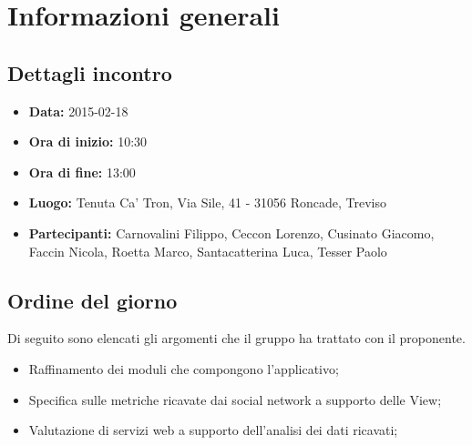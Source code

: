 %


\section{Informazioni generali} %
\label{sec:informazioni_generali}
	\subsection{Dettagli incontro} %
	\label{sub:dettagli_incontro}
		\begin{itemize}
			\item \textbf{Data:} 2015-02-18
			\item \textbf{Ora di inizio:} 10:30
			\item \textbf{Ora di fine:} 13:00
			\item \textbf{Luogo:} Tenuta Ca' Tron, Via Sile, 41 - 31056 Roncade, Treviso
			\item \textbf{Partecipanti:} Carnovalini Filippo, Ceccon Lorenzo, Cusinato Giacomo, Faccin Nicola, Roetta Marco, Santacatterina Luca, Tesser Paolo
		\end{itemize}

	\subsection{Ordine del giorno} %
	\label{sub:ordine_del_giorno}
	Di seguito sono elencati gli argomenti che il gruppo ha trattato con il proponente.
		\begin{itemize}
			\item Raffinamento dei moduli che compongono l'applicativo;
			\item Specifica sulle metriche ricavate dai social network a supporto delle View;
			\item Valutazione di servizi web a supporto dell'analisi dei dati ricavati;
		\end{itemize}
